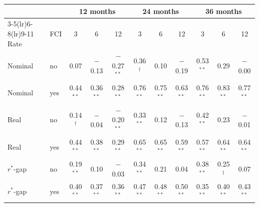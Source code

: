 \begin{tabular}{llccccccccc}
\toprule
 & & \multicolumn{3}{c}{12 months} & \multicolumn{3}{c}{24 months} & \multicolumn{3}{c}{36 months}\\
\cmidrule(lr){3-5}\cmidrule(lr){6-8}\cmidrule(lr){9-11}
Rate & FCI & 3 & 6 & 12 & 3 & 6 & 12 & 3 & 6 & 12 \\
\midrule
Nominal & no & 0.07 & $-$0.13 & $-$0.27$^{**}$ & 0.36$^{\dagger}$ & 0.10 & $-$0.19 & 0.53$^{**}$ & 0.29 & $-$0.00 \\
Nominal & yes & 0.44$^{**}$ & 0.36$^{**}$ & 0.28$^{**}$ & 0.76$^{**}$ & 0.75$^{**}$ & 0.63$^{**}$ & 0.76$^{**}$ & 0.83$^{**}$ & 0.77$^{**}$ \\
\midrule
Real & no & 0.14$^{\dagger}$ & $-$0.04 & $-$0.20$^{**}$ & 0.33$^{**}$ & 0.12 & $-$0.13 & 0.42$^{**}$ & 0.23 & $-$0.01 \\
Real & yes & 0.44$^{**}$ & 0.38$^{**}$ & 0.29$^{**}$ & 0.65$^{**}$ & 0.65$^{**}$ & 0.59$^{**}$ & 0.57$^{**}$ & 0.64$^{**}$ & 0.64$^{**}$ \\
\midrule
$r^*$-gap & no & 0.19$^{**}$ & 0.10 & $-$0.03 & 0.34$^{**}$ & 0.21 & 0.04 & 0.38$^{**}$ & 0.25$^{\dagger}$ & 0.07 \\
$r^*$-gap & yes & 0.40$^{**}$ & 0.37$^{**}$ & 0.36$^{**}$ & 0.47$^{**}$ & 0.48$^{**}$ & 0.50$^{**}$ & 0.35$^{**}$ & 0.40$^{**}$ & 0.43$^{**}$ \\
\bottomrule
\end{tabular}
